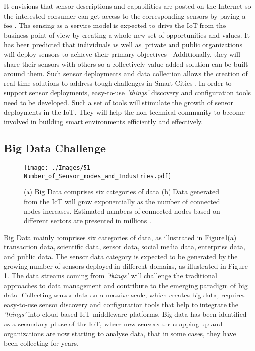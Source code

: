 \documentclass[graybox]{svmult}
\newcommand{\things}{\textit{'things' }}
\begin{document}
It envisions that sensor descriptions and capabilities are posted on the Internet so the interested  consumer can get access to the corresponding sensors by paying a fee \cite{ZMP008}. The sensing as a service model is expected to drive the IoT from the business point of view by creating a whole new set of opportunities and values. It has been predicted that individuals as well as, private and public organizations will deploy sensors to achieve their primary objectives \cite{HomeOS, ZMP008}. Additionally, they will share their sensors with others so a collectively value-added solution can be built around them. Such sensor deployments and data collection allows the creation of real-time solutions to address tough challenges in Smart Cities \cite{E5, ZMP008}. In order to support sensor deployments, easy-to-use \things discovery and configuration tools need to be developed. Such a set of tools will stimulate the growth of sensor deployments in the IoT. They will help the non-technical community to become involved in building smart environments efficiently and effectively.



\subsection{Big Data Challenge}
\label{sec:BM:Big_Data}


\begin{figure}[b]
 \centering
\texttt{[image: ./Images/51-Number\_of\_Sensor\_nodes\_and\_Industries.pdf]}
\caption{(a) Big Data comprises six categories of data  (b) Data generated from the IoT will grow exponentially as the number of connected nodes increases. Estimated numbers of connected nodes based on different sectors are presented in millions \cite{P504}.}
 \label{Figure:Statistics}
\end{figure}


Big Data \cite{P503} mainly comprises six categories of data, as illustrated in Figure\ref{Figure:Statistics}(a) transaction data, scientific data, sensor data, social media data, enterprise data, and public data. The sensor data category is expected to be generated  by the growing number of sensors deployed in different domains, as illustrated in Figure \ref{Figure:Statistics}. The data streams coming from \things will challenge the traditional approaches to data management and contribute to the emerging paradigm of big data. Collecting  sensor data on a massive scale, which  creates big data, requires easy-to-use sensor discovery  and configuration tools that help to integrate the \things into cloud-based IoT middleware platforms. Big data has been identified as a secondary phase of the IoT, where new sensors are cropping up and organizations are now starting to analyse data, that in some cases, they have been collecting for years.
\end{document}
